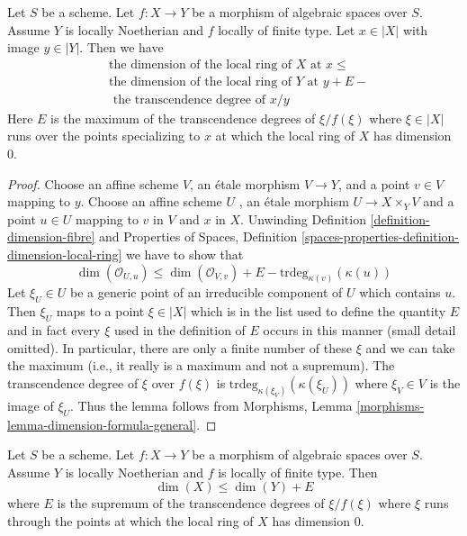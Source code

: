 \begin{lemma}
\label{lemma-dimension-formula-general}
Let $S$ be a scheme. Let $f : X \to Y$ be a morphism of algebraic
spaces over $S$. Assume $Y$ is locally Noetherian and $f$ locally
of finite type. Let $x \in |X|$ with image $y \in |Y|$.
Then we have
\begin{align*}
& \text{the dimension of the local ring of }X\text{ at }x \leq \\
& \text{the dimension of the local ring of }Y\text{ at }y + E - \\
& \text{ the transcendence degree of }x/y
\end{align*}
Here $E$ is the maximum of the transcendence degrees of $\xi/f(\xi)$
where $\xi \in |X|$ runs over the points specializing to $x$ at
which the local ring of $X$ has dimension $0$.
\end{lemma}

\begin{proof}
Choose an affine scheme $V$, an \'etale morphism $V \to Y$, and a point
$v \in V$ mapping to $y$. Choose an affine scheme $U$ , an \'etale morphism
$U \to X \times_Y V$ and a point $u \in U$ mapping to $v$ in $V$ and $x$
in $X$. Unwinding Definition \ref{definition-dimension-fibre} and
Properties of Spaces, Definition
\ref{spaces-properties-definition-dimension-local-ring}
we have to show that
$$
\dim(\mathcal{O}_{U, u}) \leq
\dim(\mathcal{O}_{V, v}) + E - \text{trdeg}_{\kappa(v)}(\kappa(u))
$$
Let $\xi_U \in U$ be a generic point of an irreducible component of
$U$ which contains $u$. Then $\xi_U$ maps to a point $\xi \in |X|$
which is in the list used to define the quantity $E$ and in fact
every $\xi$ used in the definition of $E$ occurs in this manner
(small detail omitted). In particular, there are only a finite
number of these $\xi$ and we can take the maximum (i.e., it really
is a maximum and not a supremum).
The transcendence degree of $\xi$ over $f(\xi)$ is
$\text{trdeg}_{\kappa(\xi_V)}(\kappa(\xi_U))$ where $\xi_V \in V$
is the image of $\xi_U$. Thus the lemma follows from
Morphisms, Lemma \ref{morphisms-lemma-dimension-formula-general}.
\end{proof}

\begin{lemma}
\label{lemma-alteration-dimension-general}
Let $S$ be a scheme.
Let $f : X \to Y$ be a morphism of algebraic spaces over $S$. Assume
$Y$ is locally Noetherian and $f$ is locally of finite type.
Then
$$
\dim(X) \leq \dim(Y) + E
$$
where $E$ is the supremum of the transcendence degrees of
$\xi/f(\xi)$ where $\xi$ runs through the points at
which the local ring of $X$ has dimension $0$.
\end{lemma}


